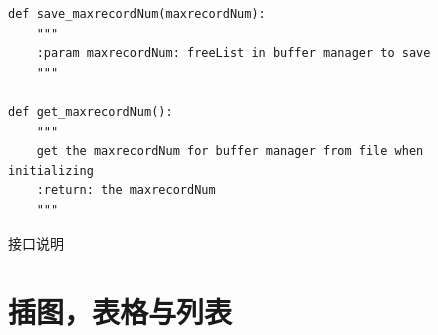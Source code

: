 \documentclass[UTF8]{ctexrep} %
\newenvironment{longlisting}{\captionsetup{type=listing}}{}
\begin{document}
\begin{appendices}
\begin{longlisting}
\begin{verbatim}
def save_maxrecordNum(maxrecordNum):
    """
    :param maxrecordNum: freeList in buffer manager to save
    """

def get_maxrecordNum():
    """
    get the maxrecordNum for buffer manager from file when initializing
    :return: the maxrecordNum
    """
    \end{verbatim}
    \caption{接口说明}
    \label{lst:interface_specification}
\end{longlisting}

\chapter{插图，表格与列表}
\listoffigures
\listoflistings
\end{appendices}
\end{document}
